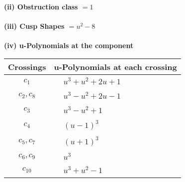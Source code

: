 \documentclass[1p]{elsarticle_modified}
\theoremstyle{definition}
\begin{document}
\flushleft \textbf{(ii) Obstruction class $= 1$}\\~\\
\flushleft \textbf{(iii) Cusp Shapes $= u^2-8$}\\~\\
\newpage\renewcommand{\arraystretch}{1}
\flushleft \textbf{(iv) u-Polynomials at the component}\newline \\
\begin{tabular}{m{50pt}|m{274pt}}
Crossings & \hspace{64pt}u-Polynomials at each crossing \\
\hline $$\begin{aligned}c_{1}\end{aligned}$$&$\begin{aligned}
&u^3+u^2+2 u+1
\end{aligned}$\\
\hline $$\begin{aligned}c_{2},c_{8}\end{aligned}$$&$\begin{aligned}
&u^3- u^2+2 u-1
\end{aligned}$\\
\hline $$\begin{aligned}c_{3}\end{aligned}$$&$\begin{aligned}
&u^3- u^2+1
\end{aligned}$\\
\hline $$\begin{aligned}c_{4}\end{aligned}$$&$\begin{aligned}
&(u-1)^3
\end{aligned}$\\
\hline $$\begin{aligned}c_{5},c_{7}\end{aligned}$$&$\begin{aligned}
&(u+1)^3
\end{aligned}$\\
\hline $$\begin{aligned}c_{6},c_{9}\end{aligned}$$&$\begin{aligned}
&u^3
\end{aligned}$\\
\hline $$\begin{aligned}c_{10}\end{aligned}$$&$\begin{aligned}
&u^3+u^2-1
\end{aligned}$\\
\hline
\end{tabular}\\~\\
\end{document}

